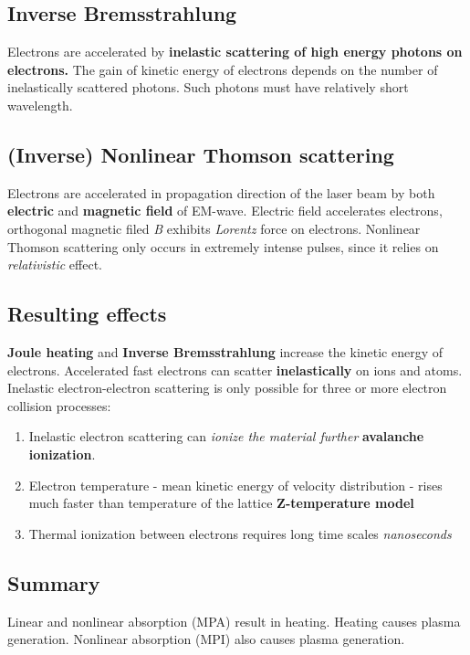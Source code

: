 \subsection{Inverse Bremsstrahlung}

Electrons are accelerated by \textbf{inelastic scattering of high energy photons on electrons.}
The gain of kinetic energy of electrons depends on the number of inelastically scattered photons. Such photons must have 
relatively short wavelength. 

\subsection{(Inverse) Nonlinear Thomson scattering}
Electrons are accelerated in propagation direction of the laser beam  by both \textbf{electric} and \textbf{magnetic field} of EM-wave. 
Electric field accelerates electrons, orthogonal magnetic filed \textit{B} exhibits \textit{Lorentz} force on electrons. 
Nonlinear Thomson scattering only occurs in extremely intense pulses, since it relies on \textit{relativistic} effect.


\subsection{Resulting effects}
\textbf{Joule heating} and \textbf{Inverse Bremsstrahlung} increase the kinetic energy of electrons. 
Accelerated fast electrons can scatter \textbf{inelastically} on ions and atoms. Inelastic electron-electron scattering is
only possible for three or more electron collision processes:
\begin{enumerate}
    \item Inelastic electron scattering can \textit{ionize the material further} \pd \textbf{avalanche ionization}.
    \item Electron temperature - mean kinetic energy of velocity distribution - rises much faster than temperature of the lattice \pd \textbf{Z-temperature model}
    \item Thermal ionization between electrons requires long time scales \pd \textit{nanoseconds}
\end{enumerate} 

\subsection{Summary}
Linear and nonlinear absorption (MPA) result in heating. Heating causes plasma generation. 
Nonlinear absorption (MPI) also causes plasma generation.


